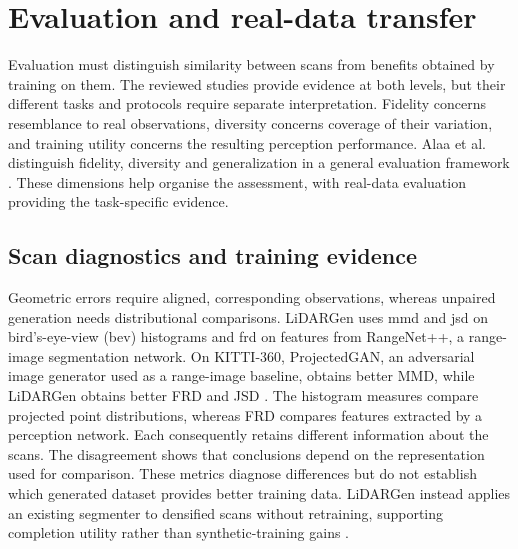\section{Evaluation and real-data transfer}
\label{sec:rq3}
\label{sec:lidar-evaluation}

Evaluation must distinguish similarity between scans from benefits obtained
by training on them. The reviewed studies provide evidence at both levels,
but their different tasks and protocols require separate interpretation.
Fidelity concerns resemblance to real observations, diversity concerns
coverage of their variation, and training utility concerns the resulting
perception performance. Alaa et al. distinguish fidelity, diversity and
generalization in a general evaluation framework
\parencite{alaaHowFaithfulYour2022}. These dimensions help organise the
assessment, with real-data evaluation providing the task-specific evidence.

\subsection{Scan diagnostics and training evidence}

Geometric errors require aligned, corresponding observations, whereas
unpaired generation needs distributional comparisons. LiDARGen uses
\gls{mmd} and \gls{jsd} on bird's-eye-view (\gls{bev}) histograms and
\gls{frd} on features from RangeNet++, a range-image segmentation network.
On KITTI-360, ProjectedGAN, an adversarial image generator used as a
range-image baseline, obtains better
MMD, while LiDARGen obtains better FRD and JSD
\parencite{zyrianovLearningGenerateRealistic2022}.
The histogram measures compare projected point distributions, whereas FRD
compares features extracted by a perception network. Each consequently
retains different information about the scans.
The disagreement shows that conclusions depend on the representation used
for comparison. These metrics diagnose differences but do not establish
which generated dataset provides better training data.
LiDARGen instead applies an existing segmenter to densified scans without
retraining, supporting completion utility rather than synthetic-training
gains \parencite{zyrianovLearningGenerateRealistic2022}.

